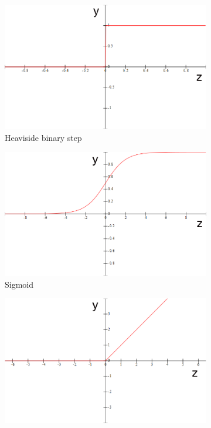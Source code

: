             \begin{figure}
                \centering
                \begin{subfigure}[t]{0.3\textwidth}
                    \includegraphics[width=\textwidth]{figures/activation_heaviside.png}
                    \caption{Heaviside binary step}%
                    \label{fig:activation_heaviside}
                \end{subfigure}
                \begin{subfigure}[t]{0.3\textwidth}
                    \includegraphics[width=\textwidth]{figures/activation_sigmoid.png}
                    \caption{Sigmoid}%
                    \label{fig:activation_sigmoid}
                \end{subfigure}
                \begin{subfigure}[t]{0.3\textwidth}
                    \includegraphics[width=\textwidth]{figures/activation_relu.png}

\end{subfigure}
\end{figure}
